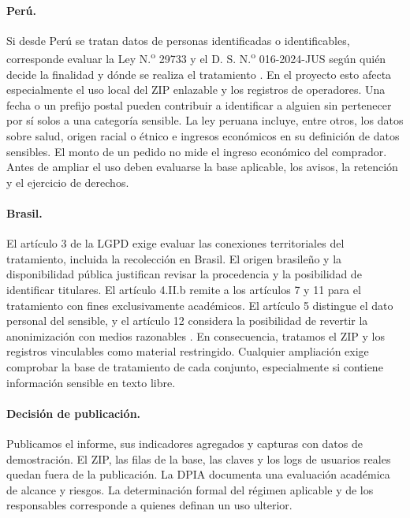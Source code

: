 \paragraph{Perú.} Si desde Perú se tratan datos de personas identificadas o identificables, corresponde evaluar la Ley N.\textsuperscript{o} 29733 y el D. S. N.\textsuperscript{o} 016-2024-JUS según quién decide la finalidad y dónde se realiza el tratamiento \cite{leyperu,peru}. En el proyecto esto afecta especialmente el uso local del ZIP enlazable y los registros de operadores. Una fecha o un prefijo postal pueden contribuir a identificar a alguien sin pertenecer por sí solos a una categoría sensible. La ley peruana incluye, entre otros, los datos sobre salud, origen racial o étnico e ingresos económicos en su definición de datos sensibles. El monto de un pedido no mide el ingreso económico del comprador. Antes de ampliar el uso deben evaluarse la base aplicable, los avisos, la retención y el ejercicio de derechos.

\paragraph{Brasil.} El artículo 3 de la LGPD exige evaluar las conexiones territoriales del tratamiento, incluida la recolección en Brasil. El origen brasileño y la disponibilidad pública justifican revisar la procedencia y la posibilidad de identificar titulares. El artículo 4.II.b remite a los artículos 7 y 11 para el tratamiento con fines exclusivamente académicos. El artículo 5 distingue el dato personal del sensible, y el artículo 12 considera la posibilidad de revertir la anonimización con medios razonables \cite{lgpd}. En consecuencia, tratamos el ZIP y los registros vinculables como material restringido. Cualquier ampliación exige comprobar la base de tratamiento de cada conjunto, especialmente si contiene información sensible en texto libre.

\paragraph{Decisión de publicación.} Publicamos el informe, sus indicadores agregados y capturas con datos de demostración. El ZIP, las filas de la base, las claves y los logs de usuarios reales quedan fuera de la publicación. La DPIA documenta una evaluación académica de alcance y riesgos. La determinación formal del régimen aplicable y de los responsables corresponde a quienes definan un uso ulterior.
